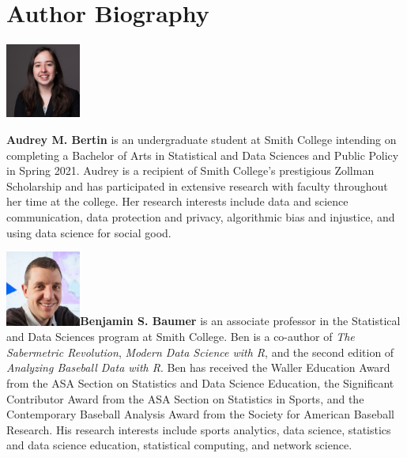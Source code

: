 \documentclass[APA,LATO1COL]{WileyNJD-v2}\usepackage[]{graphicx}\usepackage[]{color}
\begin{document}
\section*{Author Biography}

\begin{biography}{\includegraphics[width=70pt,height=70pt]{audrey_bio}}{\textbf{Audrey M. Bertin} is an undergraduate student at Smith College intending on completing a Bachelor of Arts in Statistical and Data Sciences and Public Policy in Spring 2021. Audrey is a recipient of Smith College's prestigious Zollman Scholarship and has participated in extensive research with faculty throughout her time at the college. Her research interests include data and science communication, data protection and privacy, algorithmic bias and injustice, and using data science for social good.

}
\end{biography}


\begin{biography}{\includegraphics[width=70pt,height=70pt]{ben_bio}}{\textbf{Benjamin S. Baumer} is an associate professor in the Statistical and Data Sciences program at Smith College. Ben is a co-author of \textit{The Sabermetric Revolution}, \textit{Modern Data Science with R}, and the second edition of \textit{Analyzing Baseball Data with R}. Ben has received the Waller Education Award from the ASA Section on Statistics and Data Science Education, the Significant Contributor Award from the ASA Section on Statistics in Sports, and the Contemporary Baseball Analysis Award from the Society for American Baseball Research. His research interests include sports analytics, data science, statistics and data science education, statistical computing, and network science.}
\end{biography}
\end{document}
